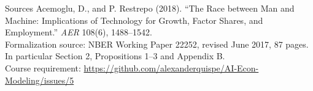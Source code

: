 \documentclass[aspectratio=169,11pt]{beamer}
\begin{document}
\begin{frame}{Sources}
\small
Acemoglu, D., and P. Restrepo (2018). ``The Race between Man and Machine: Implications of Technology for Growth, Factor Shares, and Employment.'' \emph{AER} 108(6), 1488--1542.\\[.6em]
Formalization source: NBER Working Paper 22252, revised June 2017, 87 pages. In particular Section 2, Propositions 1--3 and Appendix B.\\[.6em]
Course requirement: \url{https://github.com/alexanderquispe/AI-Econ-Modeling/issues/5}
\end{frame}
\end{document}
